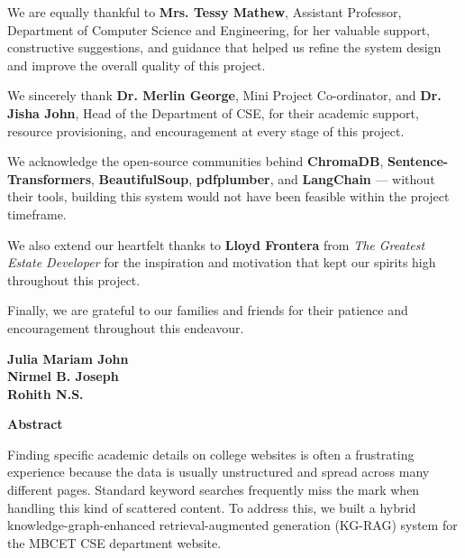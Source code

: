 \documentclass[12pt,a4paper]{report}
\begin{document}
\par
We are equally thankful to \textbf{Mrs. Tessy Mathew}, Assistant Professor, Department of Computer Science and Engineering, for her valuable support, constructive suggestions, and guidance that helped us refine the system design and improve the overall quality of this project.

\par
We sincerely thank \textbf{Dr. Merlin George}, Mini Project Co-ordinator, and \textbf{Dr. Jisha John}, Head of the Department of CSE, for their academic support, resource provisioning, and encouragement at every stage of this project.

\par
We acknowledge the open-source communities behind \textbf{ChromaDB}, \textbf{Sentence-Transformers}, \textbf{BeautifulSoup}, \textbf{pdfplumber}, and \textbf{LangChain} — without their tools, building this system would not have been feasible within the project timeframe.

\par
We also extend our heartfelt thanks to \textbf{Lloyd Frontera} from \textit{The Greatest Estate Developer} for the inspiration and motivation that kept our spirits high throughout this project.

\par
Finally, we are grateful to our families and friends for their patience and encouragement throughout this endeavour.

\begin{flushright}
\textbf{\noindent Julia Mariam John}\\
\textbf{\noindent Nirmel B. Joseph}\\
\textbf{\noindent Rohith N.S.}
\end{flushright}
\cleardoublepage

\begin{center}
  {\Large \textbf{Abstract}}\\[0.5cm]
\end{center}

Finding specific academic details on college websites is often a frustrating experience because the data is usually unstructured and spread across many different pages. Standard keyword searches frequently miss the mark when handling this kind of scattered content. To address this, we built a hybrid knowledge-graph-enhanced retrieval-augmented generation (KG-RAG) system for the MBCET CSE department website.
\end{document}
